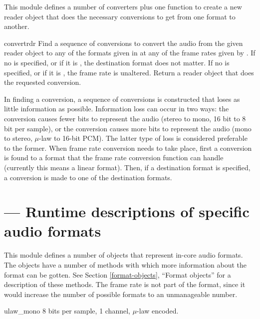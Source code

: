This module defines a number of converters plus one function to create
a new reader object that does the necessary conversions to get from
one format to another.

\begin{funcdesc}{convert}{rdr}
Find a sequence of conversions to convert the audio from the given
reader object  to any of the formats given in 
at any of the frame rates given by .  If no 
is specified, or if it is , the destination format does not
matter.  If no  is specified, or if it is , the
frame rate is unaltered.  Return a reader object that does the
requested conversion.

In finding a conversion, a sequence of conversions is constructed that
loses as little information as possible.  Information loss can occur
in two ways: the conversion causes fewer bits to represent the audio
(stereo to mono, 16 bit to 8 bit per sample), or the conversion causes
more bits to represent the audio (mono to stereo, $\mu$-law to 16-bit
PCM).  The latter type of loss is considered preferable to the former.
When frame rate conversion needs to take place, first a conversion is
found to a format that the frame rate conversion function can handle
(currently this means a linear format).  Then, if a destination format
is specified, a conversion is made to one of the destination formats.
\end{funcdesc}


\section{
         --- Runtime descriptions of specific audio formats}


This module defines a number of objects that represent in-core audio
formats.  The objects have a number of methods with which more
information about the format can be gotten.  See Section
\ref{format-objects}, ``Format objects'' for a description of these
methods.  The frame rate is not part of the format, since it would
increase the number of possible formats to an unmanageable number.

\begin{datadesc}{ulaw_mono}
8 bits per sample, 1 channel, $\mu$-law encoded.
\end{datadesc}

